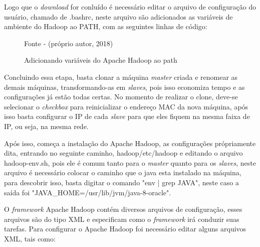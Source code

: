 Logo que o \textit{download} for conluído é necessário editar o arquivo de configuração do usuário, chamado de .bashrc, neste arquivo são adicionados as variáveis de ambiente do Hadoop ao PATH, com as seguintes linhas de código: \\

\begin{figure}[htbp!] \begin{center}
    \caption{Adicionando variáveis do Apache Hadoop ao path}
	\small{Fonte - (próprio autor, 2018)}
	\label{Fig:Adicionando variaveis do hadoop ao path}
	\end{center} 
\end{figure}


Concluindo essa etapa, basta clonar a máquina \textit{master} criada e renomear as demais máquinas, transformando-as em \textit{slaves}, pois isso economiza tempo e as configurações já estão todas certas. No momento de realizar o clone, deve-se selecionar o \textit{checkbox} para reinicializar o endereço MAC da nova máquina, após isso basta configurar o IP de cada \textit{slave} para que eles fiquem na mesma faixa de IP, ou seja, na mesma rede.

Após isso, começa a instalação do Apache Hadoop, as configurações própriamente dita, entrando no seguinte caminho, hadoop/etc/hadoop e editando o arquivo hadoop-env.sh, pois ele é comum tanto para o \textit{master} quanto para os \textit{slaves}, neste arquivo é necessário colocar o caminho que o java esta instalado na máquina, para descobrir isso, basta digitar o comando "env | grep JAVA", neste caso a saída foi "JAVA\_HOME=/usr/lib/jvm/java-8-oracle".

O \textit{framework} Apache Hadoop contém diversos arquivos de configuração, esses arquivos são do tipo XML e especificam como o \textit{framework} irá conduzir suas tarefas. Para configurar o Apache Hadoop foi necessário editar alguns arquivos XML, tais como: 

